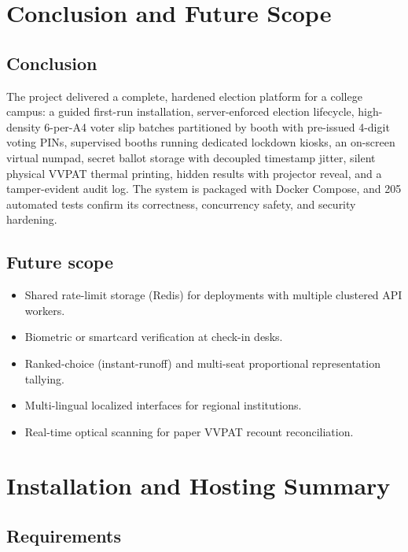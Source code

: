 \chapter{Conclusion and Future Scope}

\section{Conclusion}

The project delivered a complete, hardened election platform for a college campus: a guided first-run installation, server-enforced election lifecycle, high-density 6-per-A4 voter slip batches partitioned by booth with pre-issued 4-digit voting PINs, supervised booths running dedicated lockdown kiosks, an on-screen virtual numpad, secret ballot storage with decoupled timestamp jitter, silent physical VVPAT thermal printing, hidden results with projector reveal, and a tamper-evident audit log. The system is packaged with Docker Compose, and 205 automated tests confirm its correctness, concurrency safety, and security hardening.

\section{Future scope}

\begin{itemize}
  \item Shared rate-limit storage (Redis) for deployments with multiple clustered API workers.
  \item Biometric or smartcard verification at check-in desks.
  \item Ranked-choice (instant-runoff) and multi-seat proportional representation tallying.
  \item Multi-lingual localized interfaces for regional institutions.
  \item Real-time optical scanning for paper VVPAT recount reconciliation.
\end{itemize}

\appendix

\chapter{Installation and Hosting Summary}
\label{app:hosting}

\section{Requirements}

